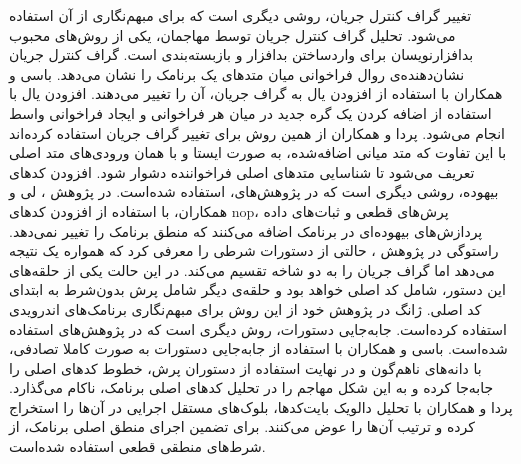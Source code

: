 تغییر گراف کنترل جریان، روشی دیگری است که برای مبهم‌نگاری از آن استفاده می‌شود. تحلیل گراف کنترل جریان توسط مهاجمان، یکی از روش‌های محبوب بدافزارنویسان برای واردساختن بدافزار و بازبسته‌بندی است. گراف کنترل جریان نشان‌دهنده‌ی روال فراخوانی میان متد‌های یک برنامک را نشان می‌دهد. باسی و همکاران با استفاده از افزودن یال به گراف جریان، آن را تغییر می‌دهند. افزودن یال با استفاده از اضافه کردن یک گره جدید در میان هر فراخوانی و ایجاد فراخوانی واسط انجام می‌شود. پردا و همکاران از همین روش برای تغییر گراف جریان استفاده کرده‌اند با این تفاوت که متد میانی اضافه‌شده، به صورت ایستا و با همان ورودی‌های متد اصلی تعریف می‌شود تا شناسایی متد‌های اصلی فراخواننده دشوار شود. افزودن کد‌های بیهوده، روشی دیگری است که در پژوهش‌های، استفاده شده‌است. در پژوهش ، لی و همکاران، با استفاده از افزودن کد‌های nop، پرش‌های قطعی‌ و ثبات‌های داده‌ پردازش‌های بیهوده‌‌ای در برنامک اضافه می‌کنند که منطق برنامک را تغییر نمی‌دهد. راستوگی در پژوهش ، حالتی از دستورات شرطی را معرفی کرد که همواره یک نتیجه می‌دهد اما گراف جریان را به دو شاخه تقسیم می‌کند. در این حالت یکی از حلقه‌های این دستور، شامل کد اصلی خواهد بود و حلقه‌ی دیگر شامل پرش بدون‌شرط به ابتدای کد اصلی. ژانگ  در پژوهش خود از این روش برای مبهم‌نگاری برنامک‌های اندرویدی استفاده  کرده‌است. جابه‌جایی دستورات، روش دیگری است که در پژوهش‌های  استفاده شده‌است. باسی و همکاران با استفاده از جابه‌جایی دستورات به صورت کاملا تصادفی، با دانه‌‌های ناهم‌گون و در نهایت استفاده از دستوران پرش، خطوط کد‌های اصلی را جابه‌جا کرده و به این شکل مهاجم را در تحلیل کد‌‌های اصلی برنامک، ناکام می‌گذارد. پردا و همکاران با تحلیل دالویک‌ بایت‌کد‌ها، بلوک‌های مستقل اجرایی در آن‌ها را استخراج کرده و ترتیب آن‌ها را عوض می‌کنند. برای تضمین اجرای منطق اصلی برنامک، از شرط‌های منطقی قطعی استفاده شده‌است.\\

